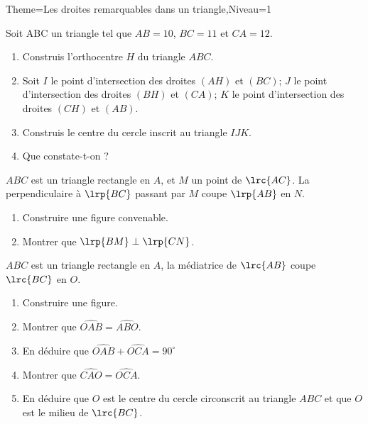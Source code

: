\documentclass[a4paper,12pt]{article}
\begin{document}
\begin{Maquette}[Fiche]{Theme=Les droites remarquables dans un triangle,Niveau=1}

\begin{exercice}
Soit ABC un triangle tel que $AB = 10$, $BC = 11$ et $CA = 12$.
\begin{enumerate}
\item Construis l'orthocentre $H$ du triangle $ABC$.
\item Soit $I$ le point d'intersection des droites $(AH)$ et $(BC)$; $J$ le point d'intersection des droites $(BH)$
et $(CA)$; $K$ le point d'intersection des droites $(CH)$ et $(AB)$.
\item Construis le centre du cercle inscrit au triangle $IJK$.
\item Que constate-t-on ?
\end{enumerate}
\end{exercice}

\begin{exercice}
$ABC$ est un triangle rectangle en $A$, et $M$ un point de $\lrc{AC}$. La perpendiculaire à $\lrp{BC}$ passant par $M$ coupe $\lrp{AB}$ en $N$.
\begin{enumerate}
\item Construire une figure convenable.
\item Montrer que $\lrp{BM}\perp\lrp{CN}$.
\end{enumerate}
\end{exercice}

\begin{exercice}
$ABC$ est un triangle rectangle en $A$, la médiatrice de $\lrc{AB}$ coupe $\lrc{BC}$ en $O$.
\begin{enumerate}
\item Construire une figure.
\item Montrer que $\widehat{OAB}=\widehat{ABO}$.
\item En déduire que $\widehat{OAB}+\widehat{OCA}=90^{\circ}$
\item Montrer que $\widehat{CAO}=\widehat{OCA}$.
\item En déduire que $O$ est le centre du cercle circonscrit au triangle $ABC$ et que $O$ est le milieu de $\lrc{BC}$.
\end{enumerate}
\end{exercice}


\end{Maquette}
\end{document}
